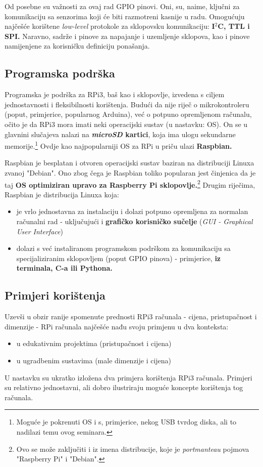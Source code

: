 \documentclass[12pt,a4paper]{article}
\begin{document}
		\par Od posebne su važnosti za ovaj rad GPIO pinovi. Oni, su, naime, ključni za komunikaciju sa senzorima koji će biti razmotreni kasnije u radu. Omogućuju najčešće korištene \textit{low-level} protokole za sklopovsku komunikaciju: \textbf{I$^2$C, TTL i SPI.} Naravno, sadrže i pinove za napajanje i uzemljenje sklopova, kao i pinove namijenjene za korisničku definiciju ponašanja.

	\subsection{Programska podrška}
		Programska je podrška za RPi3, baš kao i sklopovlje, izvedena s ciljem jednostavnosti i fleksibilnosti korištenja. Budući da nije riječ o mikrokontroleru (poput, primjerice, popularnog Arduina), već o potpuno opremljenom računalu, očito je da RPi3 mora imati neki operacijski sustav (u nastavku: OS). On se u glavnini slučajeva nalazi na \textbf{\textit{microSD} kartici}, koja ima ulogu sekundarne memorije.\footnote{Moguće je pokrenuti OS i s, primjerice, nekog USB tvrdog diska, ali to nadilazi temu ovog seminara.} Ovdje kao najpopularniji OS za RPi u priču ulazi \textbf{Raspbian.} \\

		\par Raspbian je besplatan i otvoren operacijski sustav baziran na distribuciji Linuxa zvanoj "Debian". Ono zbog čega je Raspbian toliko popularan jest činjenica da je taj \textbf{OS optimiziran upravo za Raspberry Pi sklopovlje.}\footnote{Ovo se može zaključiti i iz imena distribucije, koje je \textit{portmanteau} pojmova "Raspberry Pi" i "Debian".} Drugim riječima, Raspbian je distribucija Linuxa koja:
		\begin{itemize}
			\item je vrlo jednostavna za instalaciju i dolazi potpuno opremljena za normalan računalni rad - uključujući i \textbf{grafičko korisničko sučelje} (\textit{GUI - Graphical User Interface}) 
			\item dolazi s već instaliranom programskom podrškom za komunikaciju sa specijaliziranim sklopovljem (poput GPIO pinova) - primjerice, \textbf{iz terminala, C-a ili Pythona.}
		\end{itemize}


	\subsection{Primjeri korištenja}
	Uzevši u obzir ranije spomenute prednosti RPi3 računala - cijena, pristupačnost i dimenzije - RPi računala najčešće nađu svoju primjenu u dva konteksta:
	\begin{itemize}
		\item u edukativnim projektima (pristupačnost i cijena)
		\item u ugradbenim sustavima (male dimenzije i cijena)
	\end{itemize}
	U nastavku su ukratko izložena dva primjera korištenja RPi3 računala. Primjeri su relativno jednostavni, ali dobro ilustriraju moguće koncepte korištenja tog računala.
	\\
\end{document}
